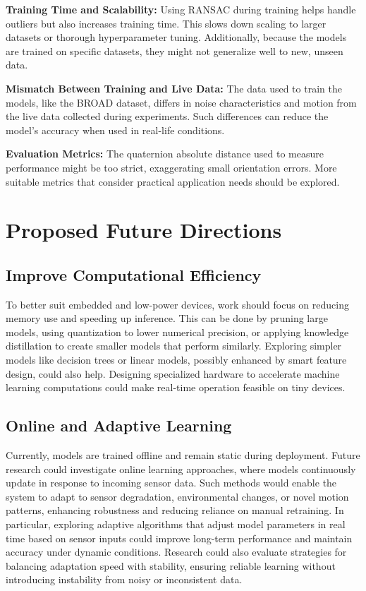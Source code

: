 \documentclass{iutbscthesis}
\begin{document}
\textbf{Training Time and Scalability:}  
Using RANSAC during training helps handle outliers but also increases training time. This slows down scaling to larger datasets or thorough hyperparameter tuning. Additionally, because the models are trained on specific datasets, they might not generalize well to new, unseen data.

\textbf{Mismatch Between Training and Live Data:}  
The data used to train the models, like the BROAD dataset, differs in noise characteristics and motion from the live data collected during experiments. Such differences can reduce the model’s accuracy when used in real-life conditions.

\textbf{Evaluation Metrics:}  
The quaternion absolute distance used to measure performance might be too strict, exaggerating small orientation errors. More suitable metrics that consider practical application needs should be explored.

\section{Proposed Future Directions}

\subsection{Improve Computational Efficiency}

To better suit embedded and low-power devices, work should focus on reducing memory use and speeding up inference. This can be done by pruning large models, using quantization to lower numerical precision, or applying knowledge distillation to create smaller models that perform similarly. Exploring simpler models like decision trees or linear models, possibly enhanced by smart feature design, could also help. Designing specialized hardware to accelerate machine learning computations could make real-time operation feasible on tiny devices.

\subsection{Online and Adaptive Learning}

Currently, models are trained offline and remain static during deployment. Future research could investigate online learning approaches, where models continuously update in response to incoming sensor data. Such methods would enable the system to adapt to sensor degradation, environmental changes, or novel motion patterns, enhancing robustness and reducing reliance on manual retraining. In particular, exploring adaptive algorithms that adjust model parameters in real time based on sensor inputs could improve long-term performance and maintain accuracy under dynamic conditions. Research could also evaluate strategies for balancing adaptation speed with stability, ensuring reliable learning without introducing instability from noisy or inconsistent data.
\end{document}
